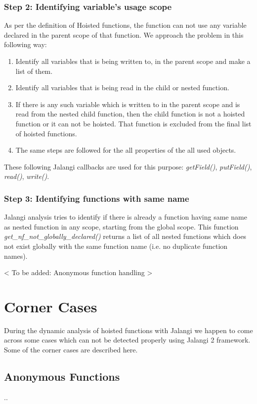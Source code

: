 \documentclass[accentcolor=tud0b,12pt,paper=a4]{tudreport}
\begin{document}
\subsection{Step 2: Identifying variable's usage scope}
As per the definition of Hoisted functions, the function can not use any variable declared in the parent scope of that function. We approach the problem in this following way:
\begin{enumerate}
	\item Identify all variables that is being written to, in the parent scope and make a list of them.
	\item Identify all variables that is being read in the child or nested function. 
	\item If there is any such variable which is written to in the parent scope and is read from the nested child function, then the child function is not a hoisted function or it can not be hoisted. That function is excluded from the final list of hoisted functions.
	\item The same steps are followed for the all properties of the all used objects.
\end{enumerate}
These following Jalangi callbacks are used for this purpose: \emph{getField()}, \emph{putField()}, \emph{read()}, \emph{write()}.

\subsection{Step 3: Identifying functions with same name}
Jalangi analysis tries to identify if there is already a function having same name as nested function in any scope, starting from the global scope. This function \emph{get\_nf\_not\_globally\_declared()} returns a list of all nested functions which does not exist globally with the same function name (i.e. no duplicate function names).

<   To be added: Anonymous function handling   >


\chapter{Corner Cases}
During the dynamic analysis of hoisted functions with Jalangi we happen to come across some cases which can not be detected properly using Jalangi 2 framework. Some of the corner cases are described here.
\section{Anonymous Functions}
..
\end{document}
